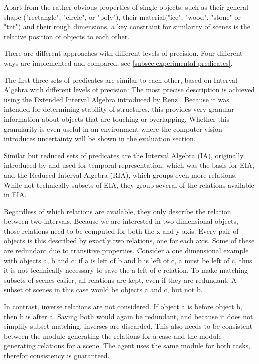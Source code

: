 Apart from the rather obvious properties of single objects, such as their general shape ("rectangle", "circle", or "poly"), their material("ice", "wood", "stone" or "tnt") and their rough dimensions, a key constraint for similarity of scenes is the relative position of objects to each other.

There are different approaches with different levels of precision. Four different ways are implemented and compared, see \ref{subsec:experimental-predicates}.

The first three sets of predicates are similar to each other, based on Interval Algebra with different levels of precision:
The most precise description is achieved using the Extended Interval Algebra introduced by Renz \cite{Renz-ERA}. Because it was intended for determining stability of structures, this provides very granular information about objects that are touching or overlapping.
Whether this granularity is even useful in an environment where the computer vision introduces uncertainty will be shown in the evaluation section.

Similar but reduced sets of predicates are the Interval Algebra (IA), originally introduced by \cite{Allen-10.1145/182.358434} and used for temporal representation, which was the basis for EIA, and the Reduced Interval Algebra (RIA), which groups even more relations. While not technically subsets of EIA, they group several of the relations available in EIA.



Regardless of which relations are available, they only describe the relation between two intervals. Because we are interested in two dimensional objects, those relations need to be computed for both the x and y axis. Every pair of objects is this described by exactly two relations, one for each axis. Some of these are redundant due to transitive properties.
Consider a one dimensional example with objects a, b and c: if a is left of b and b is left of c, a must be left of c, thus it is not technically necessary to save the a left of c relation.
To make matching subsets of scenes easier, all relations are kept, even if they are redundant. A subset of scenes in this case would be objects a and c, but not b.

In contrast, inverse relations are not considered. If object a is before object b, then b is after a. Saving both would again be redundant, and because it does not simplify subset matching, inverses are discarded. This also needs to be consistent between the module generating the relations for a case and the module generating relations for a scene. The agent uses the same module for both tasks, therefor consistency is guaranteed.

